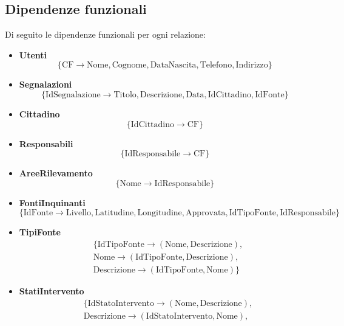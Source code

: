 \newpage
\subsection{Dipendenze funzionali}
Di seguito le dipendenze funzionali per ogni relazione:
\begin{itemize}
	\item \textbf{Utenti}
	\begin{equation*}
		\{\text{CF} \to \text{Nome}, \text{Cognome}, \text{DataNascita}, \text{Telefono}, \text{Indirizzo}\}
	\end{equation*}
	\item \textbf{Segnalazioni}
	\begin{equation*}
		\{\text{IdSegnalazione} \to \text{Titolo}, \text{Descrizione}, \text{Data}, \text{IdCittadino}, \text{IdFonte}\}
	\end{equation*}
	\item \textbf{Cittadino}
	\begin{equation*}
		\{\text{IdCittadino} \to \text{CF}\}
	\end{equation*}
	\item \textbf{Responsabili}
	\begin{equation*}
		\{\text{IdResponsabile} \to \text{CF}\}
	\end{equation*}
	\item \textbf{AreeRilevamento}
	\begin{equation*}
		\{\text{Nome} \to \text{IdResponsabile}\}
	\end{equation*}
	\item \textbf{FontiInquinanti}
	\begin{equation*}
		\{\text{IdFonte} \to \text{Livello}, \text{Latitudine}, \text{Longitudine}, \text{Approvata}, \text{IdTipoFonte}, \text{IdResponsabile}	\}
	\end{equation*}
	\item \textbf{TipiFonte}
	\begin{align*}
		& \{\text{IdTipoFonte} \to (\text{Nome}, \text{Descrizione}),\\
		& \text{Nome} \to (\text{IdTipoFonte}, \text{Descrizione}),\\
		& \text{Descrizione} \to (\text{IdTipoFonte}, \text{Nome})\}
	\end{align*}
	\item \textbf{StatiIntervento}
	\begin{align*}
		& \{\text{IdStatoIntervento} \to (\text{Nome}, \text{Descrizione}), \\
		& \text{Descrizione} \to (\text{IdStatoIntervento}, \text{Nome}),\\

\end{align*}
\end{itemize}
